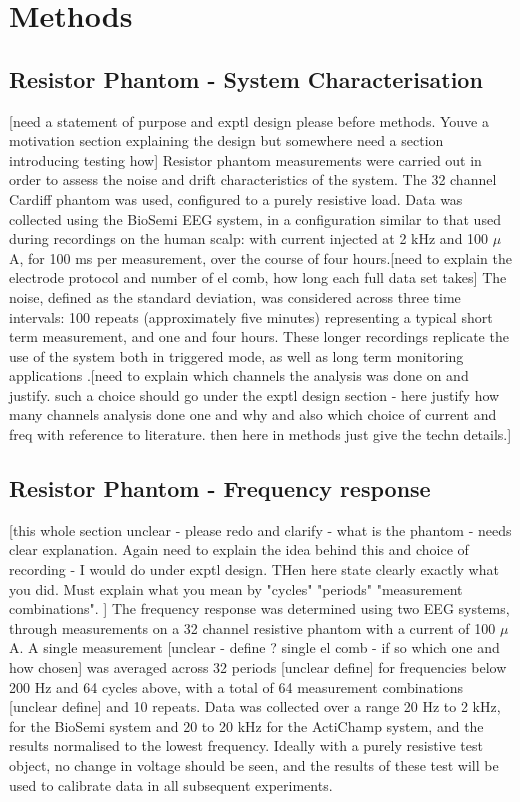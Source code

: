 \section{Methods}


\subsection{Resistor Phantom - System Characterisation}

[need a statement of purpose and exptl design please before methods. Youve a motivation section explaining the design but somewhere need a section introducing testing how]
Resistor phantom measurements were carried out in order to assess the noise and drift characteristics of the system. The 32 channel Cardiff phantom \cite{griffiths1995cole} was used, configured to a purely resistive load.  Data was collected using the BioSemi EEG system, in a configuration similar to that used during recordings on the human scalp: with current injected at 2 kHz and 100 $\mu$ A, for 100 ms per measurement, over the course of four hours.[need to explain the electrode protocol and number of el comb, how long each full data set takes] The noise, defined as the standard deviation, was considered across three time intervals: 100 repeats (approximately five minutes) representing a typical short term measurement, and one and four hours. These longer recordings replicate the use of the system both in triggered mode, as well as long term monitoring applications \cite{fu2014use} \cite{adler2012whither}.[need to explain which channels the analysis was done on and justify. such a choice should go under the exptl design section - here justify how many channels analysis done one and why and also which choice of current and freq with reference to literature. then here in methods just give the techn details.]

\subsection{Resistor Phantom - Frequency response}

[this whole section unclear - please redo and clarify - what is the phantom - needs clear explanation. Again need to explain the idea behind this and choice of recording - I would do under exptl design. THen here state clearly exactly what you did.  Must explain what you mean by "cycles" "periods" "measurement combinations". ] The frequency response was determined using two EEG systems, through measurements on a 32 channel resistive phantom with a current of 100 $\mu$ A. A single measurement [unclear - define ? single el comb - if so which one and how chosen] was averaged across 32 periods [unclear define] for frequencies below 200 Hz and 64 cycles above, with a total of 64 measurement combinations [unclear define] and 10 repeats. Data was collected over a range 20 Hz to 2 kHz, for the BioSemi system and 20 to 20 kHz for the ActiChamp system, and the results normalised to the lowest frequency.  Ideally with a purely resistive test object, no change in voltage should be seen, and the results of these test will be used to calibrate data in all subsequent experiments.